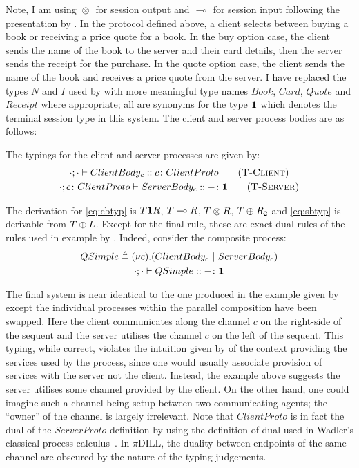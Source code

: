 Note, I am using ${}\otimes{}$ for session output and ${}\multimap{}$ for session
input following the presentation by \citeauthor{Caires:2010:STI}. In the
protocol defined above, a client selects between buying a book or receiving a
price quote for a book. In the buy option case, the client sends the name of
the book to the server and their card details, then the server sends the
receipt for the purchase. In the quote option case, the client sends the name
of the book and receives a price quote from the server. I have replaced the
types $N$ and $I$ used by \citeauthor{Caires:2010:STI} with more meaningful
type names $Book$, $Card$, $Quote$ and $Receipt$ where appropriate; all are
synonyms for the type $\mathbf{1}$ which denotes the terminal session type in this
system. The client and server process bodies are as follows:


\begin{samepage}
The typings for the client and server processes are given by:
\begin{gather*}
\tsequent{\cdot}{\cdot}{ClientBody_c}{\typedid{c}{ClientProto}}
\tag{\mkTrule{Client}} \label{eq:cbtyp}
\\ \tsequent{\cdot}{\typedid{c}{ClientProto}}{ServerBody_c}{\typedid{-}{\1}}
\tag{\mkTrule{Server}} \label{eq:sbtyp}
\end{gather*}
\end{samepage}

The derivation for \eqref{eq:cbtyp} is $T\mathbf{1} R$, ${T}\multimap{R}$, ${T}\otimes{R}$,
${T}\oplus{R_2}$ and \eqref{eq:sbtyp} is derivable from
${T}\oplus{L}$. Except for the final rule, these are exact dual rules of the
rules used in example by \citeauthor{Caires:2010:STI}. Indeed, consider the
composite process:
\begin{gather*}
{QSimple}\triangleq{(\nu{c}).({ClientBody_c}~|~{ServerBody_c})}\\
{\cdot};{\cdot}\vdash{QSimple}::{{-}\colon{\mathbf{1}}}
\end{gather*}

The final system is near identical to the one produced in the example given by
\citeauthor{Caires:2010:STI} except the individual processes within the
parallel composition have been swapped. Here the client communicates along the
channel $c$ on the right-side of the sequent and the server utilises the
channel $c$ on the left of the sequent. This typing, while correct, violates
the intuition given by \citeauthor{Caires:2010:STI} of the context providing
the services used by the process, since one would usually associate provision
of services with the server not the client. Instead, the example above
suggests the server utilises some channel provided by the client. On the other
hand, one could imagine such a channel being setup between two communicating
agents; the ``owner'' of the channel is largely irrelevant. Note that
$ClientProto$ is in fact the dual of the $ServerProto$ definition by
\citeauthor{Caires:2010:STI} using the definition of dual used in Wadler's
classical process calculus~\cite{Wadler:2014}. In $\pi$DILL, the duality
between endpoints of the same channel are obscured by the nature of the typing
judgements.

